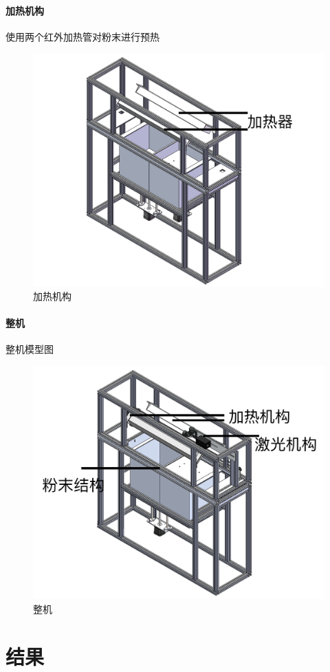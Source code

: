 \documentclass[a4paper,12pt,onecolumn,twoside]{article}
\begin{document}
\paragraph{加热机构}
使用两个红外加热管对粉末进行预热
\begin{figure}[ht]
\centering
\includegraphics[width=0.8\linewidth]{MGSLS3_3.png}
\caption{加热机构}
\end{figure}
\paragraph{整机}整机模型图
\begin{figure}[ht]
\centering
\includegraphics[width=0.8\linewidth]{MGSLS3_4.png}
\caption{整机}
\end{figure}

\newpage
\section{结果}
\end{document}
